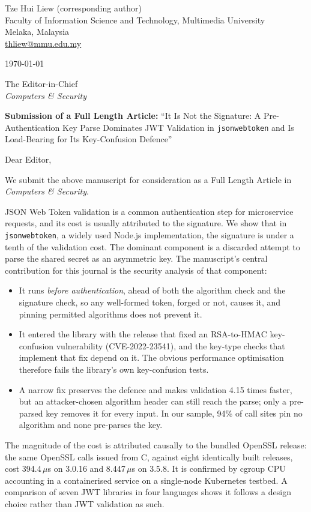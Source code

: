\documentclass[11pt,a4paper]{article}
\begin{document}
\noindent
Tze Hui Liew (corresponding author)\\
Faculty of Information Science and Technology, Multimedia University\\
Melaka, Malaysia\\
\href{mailto:thliew@mmu.edu.my}{thliew@mmu.edu.my}

\medskip
\noindent\today

\medskip
\noindent
The Editor-in-Chief\\
\emph{Computers \& Security}

\medskip
\noindent
\textbf{Submission of a Full Length Article:} ``It Is Not the Signature: A Pre-Authentication Key Parse Dominates
JWT Validation in \texttt{jsonwebtoken} and Is Load-Bearing for Its Key-Confusion Defence''

Dear Editor,

We submit the above manuscript for consideration as a Full Length Article in
\emph{Computers \& Security}.

JSON Web Token validation is a common authentication step for microservice
requests, and its cost is usually attributed to the signature. We show that in
\texttt{jsonwebtoken}, a widely used Node.js implementation, the signature is
under a tenth of the validation cost. The dominant component is a discarded
attempt to parse the shared secret as an asymmetric key. The manuscript's
central contribution for this journal is the security analysis of that
component:
\begin{itemize}
\item It runs \emph{before authentication}, ahead of both the algorithm check
  and the signature check, so any well-formed token, forged or not, causes it,
  and pinning permitted algorithms does not prevent it.
\item It entered the library with the release that fixed an RSA-to-HMAC
  key-confusion vulnerability (CVE-2022-23541), and the key-type checks that
  implement that fix depend on it. The obvious performance optimisation
  therefore fails the library's own key-confusion tests.
\item A narrow fix preserves the defence and makes validation 4.15 times
  faster, but an attacker-chosen algorithm header can still reach the parse;
  only a pre-parsed key removes it for every input. In our sample, 94\% of
  call sites pin no algorithm and none pre-parses the key.
\end{itemize}
The magnitude of the cost is attributed causally to the bundled OpenSSL
release: the same OpenSSL calls issued from C, against eight identically built
releases, cost 394.4\,$\mu$s on 3.0.16 and 8.447\,$\mu$s on 3.5.8. It is confirmed by
cgroup CPU accounting in a containerised service on a single-node Kubernetes
testbed. A comparison of seven JWT libraries in four languages shows it follows
a design choice rather than JWT validation as such.
\end{document}
